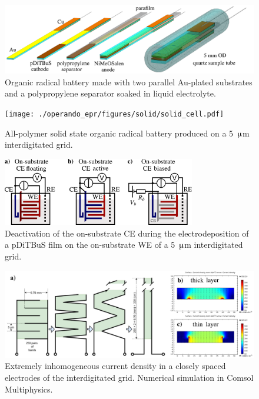 \begin{figure}[h]
\center
	\includegraphics[width=1\textwidth]{./operando_epr/figures/sandwich/sandwich.pdf}
	\caption{Organic radical battery made with two parallel Au-plated substrates and a polypropylene separator soaked in liquid electrolyte.}
	\label{fig:sandwich_assembly}
\end{figure}



\begin{figure}[h]
\center
	\texttt{[image: ./operando\_epr/figures/solid/solid\_cell.pdf]}
	\caption{All-polymer solid state organic radical battery produced on a 5~$\muup$m interdigitated grid.}
	\label{fig:transistor_battery_assewmbly}
\end{figure}


\begin{figure}[h]
\center
	\includegraphics[width=0.75\textwidth]{./operando_epr/figures/solid/separate_deposition.pdf}
	\caption{Deactivation of the on-substrate CE during the electrodeposition of a pDiTBuS film on the on-substrate WE of a 5~$\muup$m interdigitated grid.}
	\label{fig:transistor_battery_deposition}
\end{figure}

\begin{figure}[h]
\center
	\includegraphics[width=1\textwidth]{./operando_epr/figures/solid/current_density.pdf}
	\caption{Extremely inhomogeneous current density in a closely spaced electrodes of the interdigitated grid. Numerical simulation in Comsol Multiphysics.}
	\label{fig:grid_current_density_sumulation}
\end{figure}



